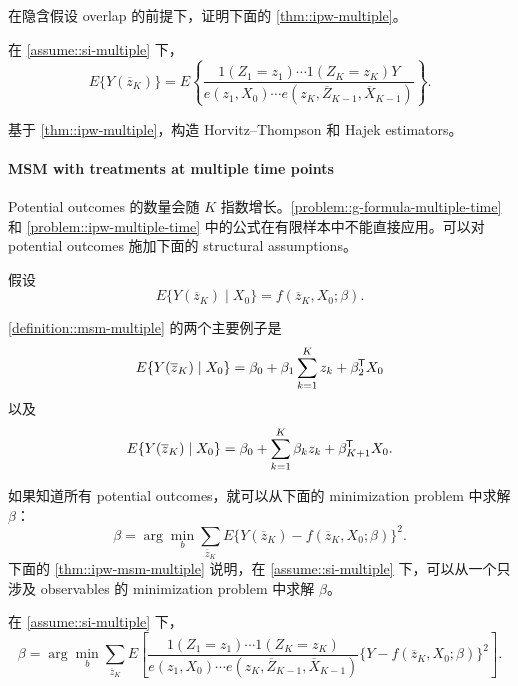 在隐含假设 overlap 的前提下，证明下面的 \cref{thm::ipw-multiple}。


\begin{theorem}
\label{thm::ipw-multiple}
在 \cref{assume::si-multiple} 下，
$$
  E\{ Y(\overline{z}_K)  \}   = E\left\{  
  \frac{1(Z_1 = z_1) \cdots  1( Z_K = z_K) Y}{    e(z_1, X_0)  \cdots  e(z_K, \overline{Z}_{K-1},  \overline{X}_{K-1})   }
  \right\}.
$$
\end{theorem}


基于 \cref{thm::ipw-multiple}，构造 Horvitz--Thompson 和 Hajek estimators。


 \paragraph{MSM with treatments at multiple time points}\label{problem::msm-multiple-time}


Potential outcomes 的数量会随 $K$ 指数增长。\cref{problem::g-formula-multiple-time} 和 \cref{problem::ipw-multiple-time} 中的公式在有限样本中不能直接应用。可以对 potential outcomes 施加下面的 structural assumptions。


\begin{definition}
\label{definition::msm-multiple}
假设
$$
  E\{ Y(\overline{z}_K)  \mid X_0\}  = f(\overline{z}_K, X_0 ; \beta  ).
$$
\end{definition}


\cref{definition::msm-multiple} 的两个主要例子是
$$
  E\{ Y(\overline{z}_K)  \mid X_0\}   = \beta_0 + \beta_1 \sum_{k=1}^K z_k + \beta_2^{\mkern-1.5mu\mathsf{T}} X_0 
  $$
以及
$$ 
 E\{ Y(\overline{z}_K)  \mid X_0\}   = \beta_0 +  \sum_{k=1}^K \beta_k z_k + \beta_{K+1}^{\mkern-1.5mu\mathsf{T}} X_0 .
 $$

如果知道所有 potential outcomes，就可以从下面的 minimization problem 中求解 $\beta$：
$$
\beta = \arg \min_b  \sum_{  \overline{z}_K  }  E\{   Y(\overline{z}_K) -  f(\overline{z}_K, X_0 ; \beta  )\}^2.
$$
下面的 \cref{thm::ipw-msm-multiple} 说明，在 \cref{assume::si-multiple} 下，可以从一个只涉及 observables 的 minimization problem 中求解 $\beta$。


\begin{theorem}
\label{thm::ipw-msm-multiple}
在 \cref{assume::si-multiple} 下，
$$
\beta = \arg \min_b  \sum_{  \overline{z}_K  }    E\left[ 
  \frac{1(Z_1 = z_1) \cdots 1( Z_K = z_K) }{    e(z_1, X_0)  \cdots  e(z_K, \overline{Z}_{K-1},  \overline{X}_{K-1})    }
  \{ Y -  f(\overline{z}_K, X_0 ; \beta  )\} ^2
  \right] .
$$
\end{theorem}



